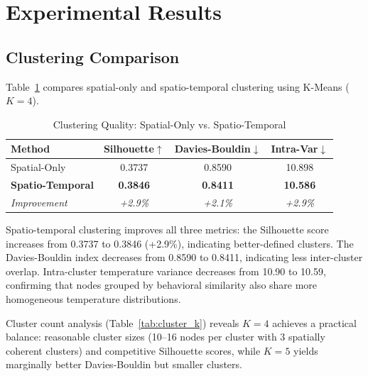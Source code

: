 \documentclass[conference]{IEEEtran}
\begin{document}
\section{Experimental Results}
\label{sec:results}

\subsection{Clustering Comparison}
\label{sec:clustering_results}

Table~\ref{tab:clustering} compares spatial-only and spatio-temporal clustering using K-Means ($K=4$).

\begin{table}[htbp]
\caption{Clustering Quality: Spatial-Only vs. Spatio-Temporal}
\begin{center}
\begin{tabular}{lccc}
\toprule
\textbf{Method} & \textbf{Silhouette}$\uparrow$ & \textbf{Davies-Bouldin}$\downarrow$ & \textbf{Intra-Var}$\downarrow$ \\
\midrule
Spatial-Only      & 0.3737 & 0.8590 & 10.898 \\
\textbf{Spatio-Temporal} & \textbf{0.3846} & \textbf{0.8411} & \textbf{10.586} \\
\midrule
\textit{Improvement} & \textit{+2.9\%} & \textit{+2.1\%} & \textit{+2.9\%} \\
\bottomrule
\end{tabular}
\label{tab:clustering}
\end{center}
\end{table}

Spatio-temporal clustering improves all three metrics: the Silhouette score increases from 0.3737 to 0.3846 (+2.9\%), indicating better-defined clusters. The Davies-Bouldin index decreases from 0.8590 to 0.8411, indicating less inter-cluster overlap. Intra-cluster temperature variance decreases from 10.90 to 10.59, confirming that nodes grouped by behavioral similarity also share more homogeneous temperature distributions.

Cluster count analysis (Table~\ref{tab:cluster_k}) reveals $K=4$ achieves a practical balance: reasonable cluster sizes (10--16 nodes per cluster with 3 spatially coherent clusters) and competitive Silhouette scores, while $K=5$ yields marginally better Davies-Bouldin but smaller clusters.
\end{document}
